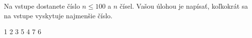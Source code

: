 




Na vstupe dostanete číslo $n \leq 100$ a $n$ čísel. Vašou úlohou je napísať, koľkokrát sa na vstupe vyskytuje najmenšie číslo.

1 2 3 5 4 7 6
\koniec


